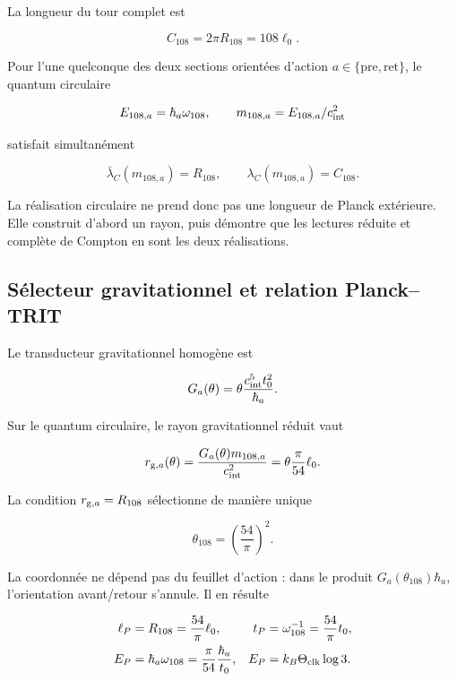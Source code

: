 La longueur du tour complet est

\begin{equation}
C_{108}=2\pi R_{108}=108\ell_0.
\label{rm:eq:cosmo-C108}
\end{equation}

Pour l’une quelconque des deux sections orientées d’action \(a\in\{\mathrm{pre},\mathrm{ret}\}\), le quantum circulaire

\[
E_{108,a}=\hbar_a\omega_{108},
\qquad
m_{108,a}=E_{108,a}/c_{\rm int}^2
\]

satisfait simultanément

\begin{equation}
\bar\lambda_C(m_{108,a})=R_{108},
\qquad
\lambda_C(m_{108,a})=C_{108}.
\label{rm:eq:cosmo-compton}
\end{equation}

La réalisation circulaire ne prend donc pas une longueur de Planck extérieure. Elle construit d’abord un rayon, puis démontre que les lectures réduite et complète de Compton en sont les deux réalisations.

\subsection{Sélecteur gravitationnel et relation Planck--TRIT}

Le transducteur gravitationnel homogène est

\begin{equation}
G_a(\theta)=\theta\frac{c_{\rm int}^5t_0^2}{\hbar_a}.
\label{rm:eq:cosmo-Gtheta}
\end{equation}

Sur le quantum circulaire, le rayon gravitationnel réduit vaut

\[
r_{{\rm g},a}(\theta)
=\frac{G_a(\theta)m_{108,a}}{c_{\rm int}^2}
=\theta\frac{\pi}{54}\ell_0.
\]

La condition \(r_{{\rm g},a}=R_{108}\) sélectionne de manière unique

\begin{equation}
\theta_{108}=\left(\frac{54}{\pi}\right)^2.
\label{rm:eq:cosmo-theta108}
\end{equation}

La coordonnée ne dépend pas du feuillet d’action : dans le produit \(G_a(\theta_{108})\hbar_a\), l’orientation avant/retour s’annule. Il en résulte

\begin{align}
\ell_P&=R_{108}=\frac{54}{\pi}\ell_0,
&
t_P&=\omega_{108}^{-1}=\frac{54}{\pi}t_0,
\label{rm:eq:cosmo-planck-length-time}\\
E_P&=\hbar_a\omega_{108}
=\frac{\pi}{54}\frac{\hbar_a}{t_0},
&
E_P&=k_B\Theta_{\rm clk}\log3.
\label{rm:eq:cosmo-planck-trit}
\end{align}

